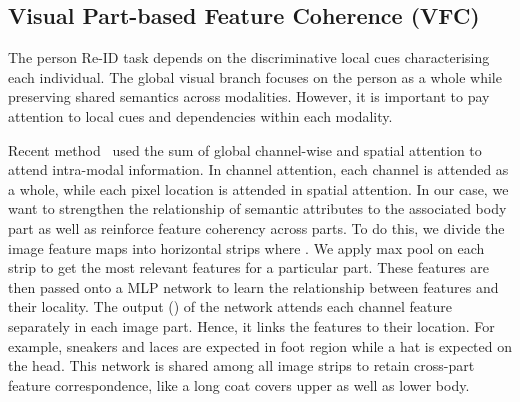 \documentclass[letterpaper]{article} \usepackage{aaai22}  \usepackage{times}  \usepackage{helvet}  \usepackage{courier}  \usepackage[hyphens]{url}  \usepackage{graphicx} \urlstyle{rm} \def\UrlFont{\rm}  \usepackage{natbib}  \usepackage{caption} \DeclareCaptionStyle{ruled}{labelfont=normalfont,labelsep=colon,strut=off} \frenchspacing  \setlength{\pdfpagewidth}{8.5in}  \setlength{\pdfpageheight}{11in}  \usepackage{algorithm}
\begin{document}
\begingroup
\begin{table}[h!]
\centering
{}
\caption{Architecture of the unified feature learning network.}
\label{architecture}
\end{table}
\endgroup
\subsection{Visual Part-based Feature Coherence (VFC)}
The person Re-ID task depends on the discriminative local cues characterising each individual. The global visual branch focuses on the person as a whole while preserving shared semantics across modalities. However, it is important to pay attention to local cues and dependencies within each modality.

Recent method~\cite{wang2020img} used the sum of global channel-wise and spatial attention to attend intra-modal information. In channel attention, each channel is attended as a whole, while each pixel location is attended in spatial attention. In our case, we want to strengthen the relationship of semantic attributes to the associated body part as well as reinforce feature coherency across parts. To do this, we divide the image feature maps into  horizontal strips  where  . We apply max pool on each strip to get the most relevant features for a particular part. These features are then passed onto a MLP network to learn the relationship between features and their locality. The output () of the network attends each channel feature separately in each image part. Hence, it links the features to their location. For example, sneakers and laces are expected in foot region while a hat is expected on the head. This network is shared among all image strips to retain cross-part feature correspondence, like a long coat covers upper as well as lower body.
\end{document}
